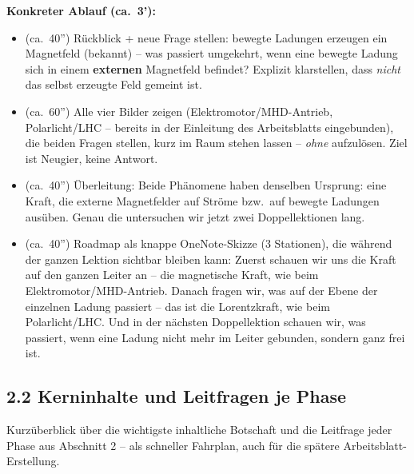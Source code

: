 \documentclass[11pt,a4paper]{article}
\begin{document}
\textbf{Konkreter Ablauf (ca.\ 3'):}
\begin{itemize}[leftmargin=1.2cm,itemsep=0.2em]
  \item (ca.\ 40'') Rückblick + neue Frage stellen: bewegte Ladungen
  erzeugen ein Magnetfeld (bekannt) -- was passiert umgekehrt, wenn eine
  bewegte Ladung sich in einem \textbf{externen} Magnetfeld befindet?
  Explizit klarstellen, dass \emph{nicht} das selbst erzeugte Feld gemeint
  ist.
  \item (ca.\ 60'') Alle vier Bilder zeigen (Elektromotor/MHD-Antrieb,
  Polarlicht/LHC -- bereits in der Einleitung des Arbeitsblatts
  eingebunden), die beiden Fragen stellen, kurz im Raum stehen lassen --
  \emph{ohne} aufzulösen. Ziel ist Neugier, keine Antwort.
  \item (ca.\ 40'') Überleitung: \glqq Beide Phänomene haben denselben
  Ursprung: eine Kraft, die externe Magnetfelder auf Ströme bzw.\ auf
  bewegte Ladungen ausüben. Genau die untersuchen wir jetzt zwei
  Doppellektionen lang.\grqq{}
  \item (ca.\ 40'') Roadmap als knappe OneNote-Skizze (3 Stationen), die
  während der ganzen Lektion sichtbar bleiben kann: \glqq Zuerst schauen
  wir uns die Kraft auf den ganzen Leiter an -- die magnetische Kraft, wie
  beim Elektromotor/MHD-Antrieb. Danach fragen wir, was auf der Ebene der
  einzelnen Ladung passiert -- das ist die Lorentzkraft, wie beim
  Polarlicht/LHC. Und in der nächsten Doppellektion schauen wir, was
  passiert, wenn eine Ladung nicht mehr im Leiter gebunden, sondern ganz
  frei ist.\grqq{}
\end{itemize}

\subsection*{2.2 Kerninhalte und Leitfragen je Phase}

Kurzüberblick über die wichtigste inhaltliche Botschaft und die Leitfrage
jeder Phase aus Abschnitt 2 -- als schneller Fahrplan, auch für die
spätere Arbeitsblatt-Erstellung.
\end{document}
